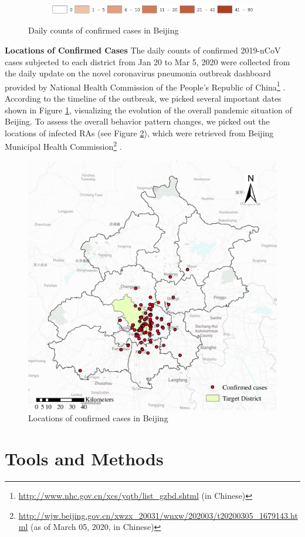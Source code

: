 \documentclass[preprints,ijgi,submit,moreauthors]{Definitions/mdpi}
\begin{document}
\begin{figure}[ht]
    \vspace{6pt}
    \begin{subfigure}{0.7\textwidth}
        \includegraphics[width=\textwidth]{Figures/Fig2legend.eps}
    \end{subfigure}
    \caption{Daily counts of confirmed cases in Beijing}
    \label{fig:number_of_confirmed_cases}
\end{figure}

\textbf{Locations of Confirmed Cases}
The daily counts of confirmed 2019-nCoV cases subjected to each district from Jan 20 to Mar 5, 2020 were collected from the daily update on the novel coronavirus pneumonia outbreak dashboard provided by National Health Commission of the People's Republic of China\footnote{\url{http://www.nhc.gov.cn/xcs/yqtb/list_gzbd.shtml} (in Chinese)} .
According to the timeline \cite{li2020early} of the outbreak, we picked several important dates shown in Figure \ref{fig:number_of_confirmed_cases}, visualizing the evolution of the overall pandemic situation of Beijing.
To assess the overall behavior pattern changes, we picked out the locations of infected RAs (see Figure \ref{fig:locations_of_confirmed_cases}), which were retrieved from Beijing Municipal Health Commission\footnote{\url{http://wjw.beijing.gov.cn/xwzx_20031/wnxw/202003/t20200305_1679143.html} (as of March 05, 2020, in Chinese)} .  

\begin{figure}[ht]
    \centering
    \includegraphics[width=.5\textwidth]{Figures/Plot_location_confirmed_cases.eps}
    \caption{Locations of confirmed cases in Beijing}
    \label{fig:locations_of_confirmed_cases}
\end{figure} 

\section{Tools and Methods}
\end{document}
